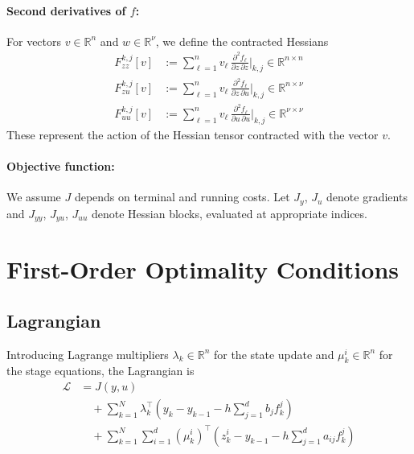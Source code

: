 \documentclass[11pt]{article}
\newcommand{\LL}{\mathcal{L}}
\newcommand{\RR}{\mathbb{R}}
\newcommand{\tp}{^\top}
\newcommand{\pder}[2]{\frac{\partial #1}{\partial #2}}
\begin{document}
\paragraph{Second derivatives of $f$:} For vectors $v\in\RR^n$ and $w\in\RR^\nu$, we define the contracted Hessians
\begin{align}
F_{zz}^{k,j}[v] &:= \sum_{\ell=1}^n v_\ell \, \pder{^2 f_\ell}{z\,\partial z}\bigg|_{k,j} \in \RR^{n\times n} \\[4pt]
F_{zu}^{k,j}[v] &:= \sum_{\ell=1}^n v_\ell \, \pder{^2 f_\ell}{z\,\partial u}\bigg|_{k,j} \in \RR^{n\times \nu} \\[4pt]
F_{uu}^{k,j}[v] &:= \sum_{\ell=1}^n v_\ell \, \pder{^2 f_\ell}{u\,\partial u}\bigg|_{k,j} \in \RR^{\nu\times \nu}
\end{align}
These represent the action of the Hessian tensor contracted with the vector $v$.

\paragraph{Objective function:} We assume $J$ depends on terminal and running costs. Let $J_y$, $J_u$ denote gradients and $J_{yy}$, $J_{yu}$, $J_{uu}$ denote Hessian blocks, evaluated at appropriate indices.

\section{First-Order Optimality Conditions}

\subsection{Lagrangian}

Introducing Lagrange multipliers $\lambda_k\in\RR^n$ for the state update and $\mu_k^i\in\RR^n$ for the stage equations, the Lagrangian is
\begin{equation}
\begin{aligned}
\LL &= J(y,u) \\
&\quad + \sum_{k=1}^N \lambda_k\tp \left( y_k - y_{k-1} - h\sum_{j=1}^d b_j f_k^j \right) \\
&\quad + \sum_{k=1}^N \sum_{i=1}^d (\mu_k^i)\tp \left( z_k^i - y_{k-1} - h\sum_{j=1}^d a_{ij} f_k^j \right)
\end{aligned}
\end{equation}
\end{document}
